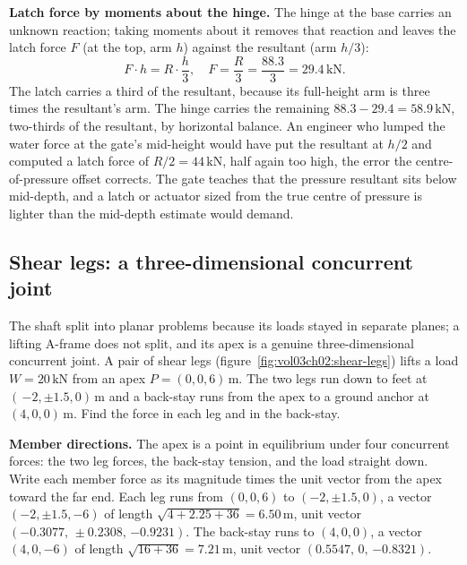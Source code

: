 \textbf{Latch force by moments about the hinge.} The hinge at the base
carries an unknown reaction; taking moments about it removes that reaction
and leaves the latch force $F$ (at the top, arm $h$) against the resultant
(arm $h/3$):
\[
F\cdot h = R\cdot\frac{h}{3}, \quad
F = \frac{R}{3} = \frac{88.3}{3} = 29.4\,\text{kN}.
\]
The latch carries a third of the resultant, because its full-height arm is
three times the resultant's arm. The hinge carries the remaining
$88.3 - 29.4 = 58.9\,\text{kN}$, two-thirds of the resultant, by horizontal
balance. An engineer who lumped the water force at the gate's mid-height
would have put the resultant at $h/2$ and computed a latch force of
$R/2 = 44\,\text{kN}$, half again too high, the error the centre-of-pressure
offset corrects. The gate teaches that the pressure resultant sits below
mid-depth, and a latch or actuator sized from the true centre of pressure
is lighter than the mid-depth estimate would demand.

\subsection{Shear legs: a three-dimensional concurrent joint}

The shaft split into planar problems because its loads stayed in separate
planes; a lifting A-frame does not split, and its apex is a genuine
three-dimensional concurrent joint. A pair of shear legs
(figure~\ref{fig:vol03ch02:shear-legs}) lifts a load $W = 20\,\text{kN}$
from an apex $P = (0, 0, 6)\,\si{\meter}$. The two legs run down to feet at
$(\,{-2}, \pm 1.5, 0)\,\si{\meter}$ and a back-stay runs from the apex to a
ground anchor at $(4, 0, 0)\,\si{\meter}$. Find the force in each leg and in
the back-stay.

\textbf{Member directions.} The apex is a point in equilibrium under four
concurrent forces: the two leg forces, the back-stay tension, and the load
straight down. Write each member force as its magnitude times the unit
vector from the apex toward the far end. Each leg runs from $(0,0,6)$ to
$({-2},\pm 1.5, 0)$, a vector $({-2},\pm 1.5,{-6})$ of length
$\sqrt{4 + 2.25 + 36} = 6.50\,\si{\meter}$, unit vector
$({-0.3077},\,\pm 0.2308,\,{-0.9231})$. The back-stay runs to $(4,0,0)$, a
vector $(4,0,{-6})$ of length $\sqrt{16 + 36} = 7.21\,\si{\meter}$, unit
vector $(0.5547,\,0,\,{-0.8321})$.

